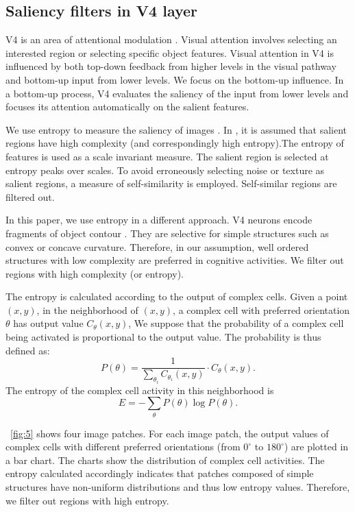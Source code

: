 \documentclass[10pt]{article}
\begin{document}
\subsection{Saliency filters in V4 layer}

V4 is an area of attentional modulation \cite{roe2012}.
Visual attention involves selecting an interested region or selecting specific object features.
Visual attention in V4 is influenced by both top-down feedback from higher levels in the visual pathway
and bottom-up input from lower levels.
We focus on the bottom-up influence.
In a bottom-up process, V4 evaluates the saliency of the input from lower levels
and focuses its attention automatically on the salient features.

We use entropy to measure the saliency of images \cite{kadir2001}.
In \cite{kadir2001}, it is assumed that salient regions have high complexity (and correspondingly high entropy).The entropy of features is used as a scale invariant measure.
The salient region is selected at entropy peaks over scales.
To avoid erroneously selecting noise or texture as salient regions,
a measure of self-similarity is employed.
Self-similar regions are filtered out.

In this paper, we use entropy in a different approach.
V4 neurons encode fragments of object contour \cite{pasupathy2001,pasupathy2002}.
They are selective for simple structures such as convex or concave curvature.
Therefore, in our assumption, 
well ordered structures with low complexity are preferred in cognitive activities.
We filter out regions with high complexity (or entropy).

The entropy is calculated according to the output of complex cells.
Given a point $(x,y)$, in the neighborhood of $(x,y)$,
a complex cell with preferred orientation $\theta$ has output value $C_{\theta}(x,y)$,
We suppose that the probability of a complex cell being activated
is proportional to the output value.
The probability is thus defined as:
\begin{equation}
P(\theta)=\frac{1}{\sum_{\theta_i} C_{\theta_i}(x,y)}\cdot C_{\theta}(x,y).
\end{equation}
The entropy of the complex cell activity in this neighborhood
is 
\begin{equation}
E=-\sum_{\theta} P(\theta) \log P(\theta).
\end{equation}

\figurename~\ref{fig:5} shows four image patches.
For each image patch, the output values of complex cells with different preferred orientations
(from $0^\circ$ to $180^\circ$) are plotted in a bar chart.
The charts show the distribution of complex cell activities.
The entropy calculated accordingly indicates that 
patches composed of simple structures have non-uniform distributions and thus low entropy values.
Therefore, we filter out regions with high entropy.
\end{document}
